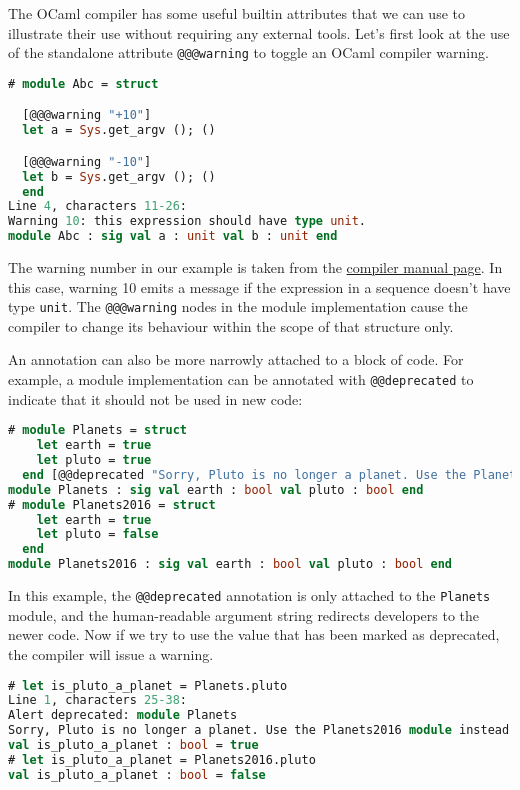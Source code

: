 The OCaml compiler has some useful builtin attributes that we can use to
illustrate their use without requiring any external tools. Let's first
look at the use of the standalone attribute
\passthrough{\lstinline!@@@warning!} to toggle an OCaml compiler
warning.

\begin{lstlisting}[language=Caml]
# module Abc = struct

  [@@@warning "+10"]
  let a = Sys.get_argv (); ()

  [@@@warning "-10"]
  let b = Sys.get_argv (); ()
  end
Line 4, characters 11-26:
Warning 10: this expression should have type unit.
module Abc : sig val a : unit val b : unit end
\end{lstlisting}

The warning number in our example is taken from the
\href{https://caml.inria.fr/pub/docs/manual-ocaml/native.html}{compiler
manual page}. In this case, warning 10 emits a message if the expression
in a sequence doesn't have type \passthrough{\lstinline!unit!}. The
\passthrough{\lstinline!@@@warning!} nodes in the module implementation
cause the compiler to change its behaviour within the scope of that
structure only.

An annotation can also be more narrowly attached to a block of code. For
example, a module implementation can be annotated with
\passthrough{\lstinline!@@deprecated!} to indicate that it should not be
used in new code:

\begin{lstlisting}[language=Caml]
# module Planets = struct
    let earth = true
    let pluto = true
  end [@@deprecated "Sorry, Pluto is no longer a planet. Use the Planets2016 module instead."]
module Planets : sig val earth : bool val pluto : bool end
# module Planets2016 = struct
    let earth = true
    let pluto = false
  end
module Planets2016 : sig val earth : bool val pluto : bool end
\end{lstlisting}

In this example, the \passthrough{\lstinline!@@deprecated!} annotation
is only attached to the \passthrough{\lstinline!Planets!} module, and
the human-readable argument string redirects developers to the newer
code. Now if we try to use the value that has been marked as deprecated,
the compiler will issue a warning.

\begin{lstlisting}[language=Caml]
# let is_pluto_a_planet = Planets.pluto
Line 1, characters 25-38:
Alert deprecated: module Planets
Sorry, Pluto is no longer a planet. Use the Planets2016 module instead.
val is_pluto_a_planet : bool = true
# let is_pluto_a_planet = Planets2016.pluto
val is_pluto_a_planet : bool = false
\end{lstlisting}


